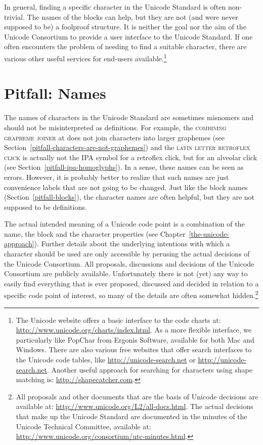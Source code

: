 In general, finding a specific character in the Unicode Standard is often non-trivial. 
The names of the blocks can help, but they are not (and were never supposed
to be) a foolproof structure. It is neither the goal nor the aim of the Unicode
Consortium to provide a user interface to the Unicode Standard. If one often
encounters the problem of needing to find a suitable character, there are
various other useful services for end-users available.\footnote{The Unicode
website offers a basic interface to the code charts at:
\url{http://www.unicode.org/charts/index.html}. As a more flexible interface, we
particularly like PopChar from Ergonis Software, available for both Mac and
Windows. There are also various free websites that offer search interfaces
to the Unicode code tables, like \url{http://unicode-search.net} or
\url{http://unicode-search.net}. Another useful approach for searching for characters
using shape matching \citep{Belongie2002} is: \url{http://shapecatcher.com}.}

\section{Pitfall: Names}
\label{pitfall-names}

The names of characters in the Unicode Standard are sometimes misnomers and
should not be misinterpreted as definitions. For example, the \textsc{combining
grapheme joiner} at  does not join characters into larger graphemes
(see Section~\ref{pitfall-characters-are-not-graphemes}) and the \textsc{latin
letter retroflex click}  is actually not the IPA symbol for a
retroflex click, but for an alveolar click (see
Section~\ref{pitfall-ipa-homoglyphs}). In a sense, these names can be seen as
errors. However, it is probably better to realize that such names are just
convenience labels that are not going to be changed. Just like the block names
(Section~\ref{pitfall-blocks}), the character names are often helpful, but they
are not supposed to be definitions.

The actual intended meaning of a Unicode code point is a combination of the
name, the block and the character properties (see
Chapter~\ref{the-unicode-approach}). Further details about the underlying intentions 
with which a character should be used
are only accessible by perusing the actual decisions of the Unicode Consortium.
All proposals, discussions and decisions of the Unicode Consortium are publicly
available. Unfortunately there is not (yet) any way to easily find everything
that is ever proposed, discussed and decided in relation to a specific
code point of interest, so many of the details are often somewhat
hidden.\footnote{All proposals and other documents that are the basis of Unicode
decisions are available at: \url{http://www.unicode.org/L2/all-docs.html}. The
actual decisions that make up the Unicode Standard are documented in the minutes
of the Unicode Technical Committee, available at: 
\url{http://www.unicode.org/consortium/utc-minutes.html}.}

